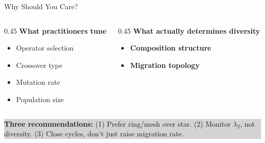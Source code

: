 \documentclass[aspectratio=169,12pt]{beamer}
\begin{document}
\begin{frame}{Why Should You Care?}
\begin{columns}[T]
  \begin{column}{0.45\textwidth}
    \textbf{\color{midgray}What practitioners tune}
    \vspace{0.5em}
    \begin{itemize}\setlength\itemsep{0.4em}
      \item[\color{midgray}$\circ$] {\color{midgray}Operator selection}
      \item[\color{midgray}$\circ$] {\color{midgray}Crossover type}
      \item[\color{midgray}$\circ$] {\color{midgray}Mutation rate}
      \item[\color{midgray}$\circ$] {\color{midgray}Population size}
    \end{itemize}
  \end{column}
  \begin{column}{0.45\textwidth}
    \textbf{\color{accentblue}What actually determines diversity}
    \vspace{0.5em}
    \begin{itemize}\setlength\itemsep{0.4em}
      \item[\color{accentblue}$\blacktriangleright$] \textbf{Composition structure}
      \item[\color{accentblue}$\blacktriangleright$] \textbf{Migration topology}
    \end{itemize}
  \end{column}
\end{columns}
\vspace{1.2em}
\begin{center}
  \colorbox{lightgray}{\parbox{0.88\textwidth}{\centering
    \small\color{textgray}
    \textbf{Three recommendations:} (1) Prefer ring/mesh over star.\quad
    (2) Monitor $\lambda_2$, not diversity.\quad
    (3) Close cycles, don't just raise migration rate.
  }}
\end{center}
\end{frame}
\end{document}
